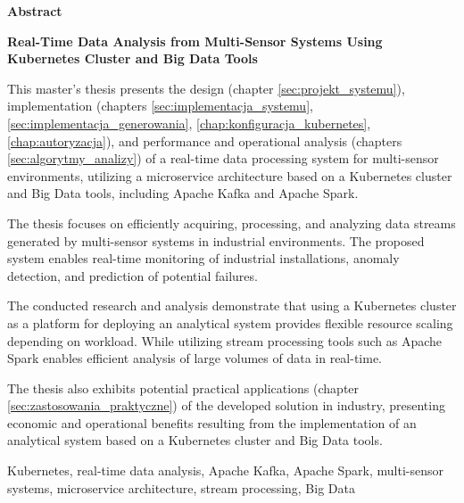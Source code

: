 \begin{abstract_en}
\begin{center}
\textbf{\large Abstract}
\end{center}

\begin{center}
 \textbf{Real-Time Data Analysis from Multi-Sensor Systems Using Kubernetes Cluster and Big Data Tools}\\
\end{center}

This master's thesis presents the design (chapter \ref{sec:projekt_systemu}), implementation (chapters \ref{sec:implementacja_systemu}, \ref{sec:implementacja_generowania}, \ref{chap:konfiguracja_kubernetes}, \ref{chap:autoryzacja}), and performance and operational analysis (chapters \ref{sec:algorytmy_analizy}) of a real-time data processing system for multi-sensor environments, utilizing a microservice architecture based on a Kubernetes cluster and Big Data tools, including Apache Kafka and Apache Spark.

The thesis focuses on efficiently acquiring, processing, and analyzing data streams generated by multi-sensor systems in industrial environments. The proposed system enables real-time monitoring of industrial installations, anomaly detection, and prediction of potential failures.

The conducted research and analysis demonstrate that using a Kubernetes cluster as a platform for deploying an analytical system provides flexible resource scaling depending on workload. While utilizing stream processing tools such as Apache Spark enables efficient analysis of large volumes of data in real-time.

The thesis also exhibits potential practical applications (chapter \ref{sec:zastosowania_praktyczne}) of the developed solution in industry, presenting economic and operational benefits resulting from the implementation of an analytical system based on a Kubernetes cluster and Big Data tools.

\begin{keywords_en}
Kubernetes, real-time data analysis, Apache Kafka, Apache Spark, multi-sensor systems, microservice architecture, stream processing, Big Data
\end{keywords_en}
\end{abstract_en}